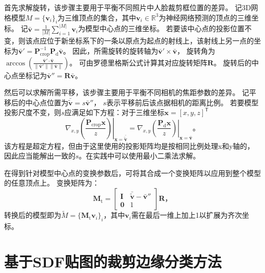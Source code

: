 首先求解旋转，该步骤主要用于平衡不同照片中人脸裁剪框位置的差异。
记3D网格模型$M=\{\mathbf{v}_i\}_i$为三维顶点的集合，其中$\mathbf{v}_i\in\mathbb{R}^3$为神经网络预测的顶点的三维坐标。
记$\bar{\mathbf{v}} = \frac{1}{|M|}\sum_{i=1}^{|M|}\mathbf{v}_i$为模型中心点的三维坐标。
若要该中心点的投影位置不变，则该点应位于新坐标系下的一条以原点为起点的射线上，该射线上另一点的坐标为$\bar{\mathbf{v}}' = \mathbf{P}_\mathrm{crop}^{-1}\mathbf{P}_\mathrm{d}\bar{\mathbf{v}}$。
因此，所需旋转的旋转轴为$\bar{\mathbf{v}}' \times \bar{\mathbf{v}}$，
旋转角为$\arccos\left(\frac{\bar{\mathbf{v}}'\cdot\bar{\mathbf{v}}}{\|\bar{\mathbf{v}}'\|\|\bar{\mathbf{v}}\|}\right)$。
可由罗德里格斯公式计算其对应旋转矩阵$\mathbf{R}$。
旋转后的中心点坐标记为$\bar{\mathbf{v}}'' = \mathbf{R}\bar{\mathbf{v}}$。

然后可以求解所需平移，该步骤主要用于平衡不同相机的焦距参数的差异。
记平移后的中心点位置为$\bar{\tilde{\mathbf{v}}} = s\bar{\mathbf{v}}''$，
$s$表示平移前后该点据相机的距离比例。
若要模型投影尺度不变，则$s$应满足如下方程：对于三维坐标$\mathbf{x}=[x,y,z]^\mathsf{T}$
\begin{equation}
    \left.\nabla_{x,y}\left(\frac{\mathbf{P}_\mathrm{crop}\mathbf{x}}{z}\right)\right|_{\mathbf{x}=\bar{\tilde{\mathbf{v}}}} =
    \left.\nabla_{x,y}\left(\frac{\mathbf{P}_\mathrm{d}\mathbf{x}}{z}\right)\right|_{\mathbf{x}=\bar{\mathbf{v}}}
    \text{。}
\end{equation}
该方程是超定方程，但由于这里使用的投影矩阵均是按相同比例处理x和y轴的，因此应当能解出一致的$s$。在实践中可以使用最小二乘法求解。

在得到针对模型中心点的变换参数后，可将其合成一个变换矩阵以应用到整个模型的任意顶点上。
变换矩阵为：
\begin{equation}
    \mathbf{M}_\mathrm{t} = \begin{bmatrix}
        \mathbf{I} & \bar{\tilde{\mathbf{v}}} - \bar{\mathbf{v}}'' \\
        \mathbf{0} & 1
    \end{bmatrix}\mathbf{R}
    \text{，}
\end{equation}
转换后的模型即为$\tilde{M}=\{\mathbf{M}_\mathrm{t}\mathbf{v}_i\}_i$，其中$\mathbf{v}_i$需在最后一维上加上1以扩展为齐次坐标。

\section{基于SDF贴图的裁剪边缘分类方法}
\label{sec:recon_sdf}

